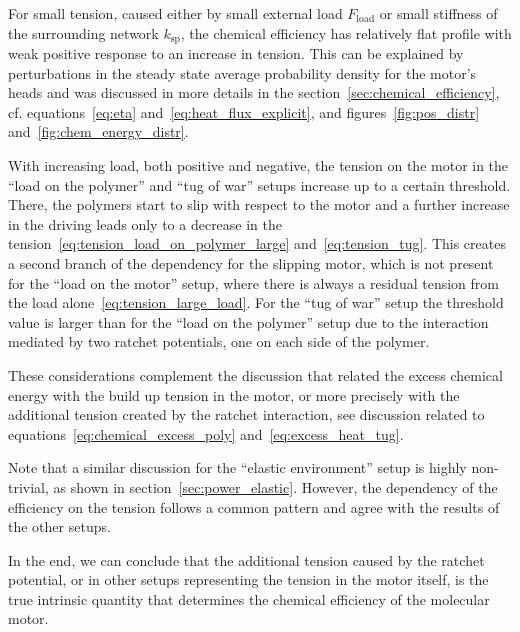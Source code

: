\documentclass[aps,pre,twocolumn,showpacs,showkeys,superscriptaddress,floatfix]{revtex4-1}
\begin{document}
For small tension, caused either by small external load $F_\text{load}$ or small stiffness of the surrounding network $k_\text{sp}$, 
the chemical efficiency has relatively flat profile with weak positive response to an increase in tension.
This can be explained by perturbations in the steady state average probability density for the motor's heads 
and was discussed in more details in the section~\ref{sec:chemical_efficiency}, 
cf. equations~\eqref{eq:eta} and~\eqref{eq:heat_flux_explicit}, and figures~\ref{fig:pos_distr} and~\ref{fig:chem_energy_distr}.  

With increasing load, both positive and negative, the tension on the motor in the ``load on the polymer'' and ``tug of war'' setups increase up to a certain threshold.
There, the polymers start to slip with respect to the motor and a further increase in the driving leads only to a decrease in the tension~\eqref{eq:tension_load_on_polymer_large} and~\eqref{eq:tension_tug}.
This creates a second branch of the dependency for the slipping motor, 
which is not present for the ``load on the motor'' setup, where there is always a residual tension from the load alone~\eqref{eq:tension_large_load}.  
For the ``tug of war'' setup the threshold value is larger than for the ``load on the polymer'' setup due to the interaction mediated by two ratchet potentials, one on each side of the polymer. 

These considerations complement the discussion that related the excess chemical energy with the build up tension in the motor, or more precisely with the additional tension created by the ratchet interaction, see discussion related to equations~\eqref{eq:chemical_excess_poly} and~\eqref{eq:excess_heat_tug}. 

Note that a similar discussion for the ``elastic environment'' setup is highly non-trivial, as shown in section~\ref{sec:power_elastic}.
However, the dependency of the efficiency on the tension follows a common pattern and agree with the results of the other setups. 

In the end, we can conclude that the additional tension caused by the ratchet potential, or in other setups representing the tension in the motor itself, is the true intrinsic quantity that determines the chemical efficiency of the molecular motor. 
\end{document}
